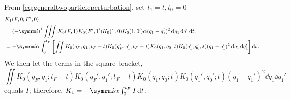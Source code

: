 From \cref{eq:generaltwoparticleperturbation}, set $t_1 = t, t_0 = 0$
\begin{align}
    &K_1(F, 0; F', 0) \nonumber \\
    &= \left(-\im\right)^1\iiint K_0(F, 1)K_0(F', 1')K_0(1, 0)K_0(1, 0')\alpha(q_1 - q_1')^2\dd{q_1}\dd{q_1'}\dd{t}. \\
    &= -\im\alpha\int_0^{t_F}\left[\iint K_0(q_F, q_1; t_F - t)K_0(q_F', q_1'; t_F - t)K_0(q_1, q_0; t)K_0(q_1', q_0'; t)(q_1 - q_1')^2\dd{q_1}\dd{q_1'}\right]\dd{t}. \nonumber
\end{align}
We then let the terms in the square bracket,
\begin{equation}
    \iint K_0(q_F, q_1; t_F - t)K_0(q_F', q_1'; t_F - t)K_0(q_1, q_0; t)K_0(q_1', q_0'; t)(q_1 - q_1')^2\dd{q_1}\dd{q_1'}
\end{equation}
equals $I$; therefore, $K_1 = -\im\alpha\int_0^{t_F} I\dd{t}$.


